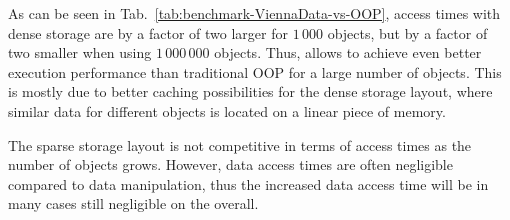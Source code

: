 As can be seen in Tab.~\ref{tab:benchmark-ViennaData-vs-OOP}, access times with dense storage are by a factor of two larger for $1\,000$ objects, but by a factor of two smaller when using $1\,000\,000$ objects.
Thus, {\ViennaData} allows to achieve even better execution performance than traditional OOP for a large number of objects. This is mostly due to better caching possibilities for the dense storage layout, where similar data for different objects is located on a linear piece of memory.

The sparse storage layout is not competitive in terms of access times as the number of objects grows. However, data access times are often negligible compared to data manipulation, thus
the increased data access time will be in many cases still negligible on the overall.